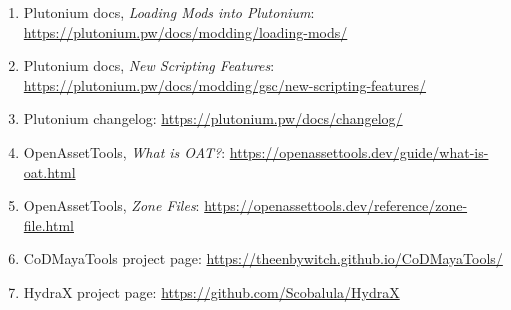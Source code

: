 \documentclass[11pt]{article}
\begin{document}
\begin{enumerate}
  \item Plutonium docs, \emph{Loading Mods into Plutonium}: \url{https://plutonium.pw/docs/modding/loading-mods/}
  \item Plutonium docs, \emph{New Scripting Features}: \url{https://plutonium.pw/docs/modding/gsc/new-scripting-features/}
  \item Plutonium changelog: \url{https://plutonium.pw/docs/changelog/}
  \item OpenAssetTools, \emph{What is OAT?}: \url{https://openassettools.dev/guide/what-is-oat.html}
  \item OpenAssetTools, \emph{Zone Files}: \url{https://openassettools.dev/reference/zone-file.html}
  \item CoDMayaTools project page: \url{https://theenbywitch.github.io/CoDMayaTools/}
  \item HydraX project page: \url{https://github.com/Scobalula/HydraX}
\end{enumerate}
\end{document}
